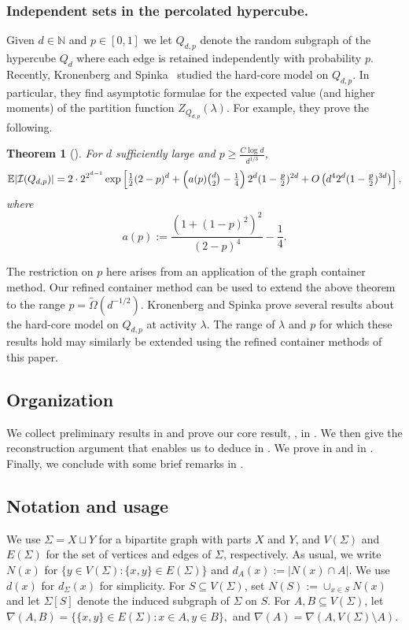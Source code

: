 \documentclass[10pt,a4paper]{amsart}
\newtheorem{thm}{Theorem}[section]
\theoremstyle{definition}
\newcommand{\cI}{\mathcal{I} }
\newcommand{\sub}[0]{\subseteq}
\newcommand{\0}[0]{\emptyset}
\newcommand{\lam}{\lambda}
\begin{document}
\subsubsection*{Independent sets in the percolated hypercube.}

Given $d\in \mathbb{N}$ and $p\in [0,1]$ we let $Q_{d,p}$ denote the random subgraph of the hypercube $Q_d$ where each edge is retained independently with probability $p$. Recently, Kronenberg and Spinka~\cite{kronenberg2022independent} studied the hard-core model on $Q_{d,p}$. In particular, they find asymptotic formulae for the expected value (and higher moments) of the partition function $Z_{Q_{d,p}}(\lam)$. For example, they prove the following.

\begin{thm}[{\cite[Theorem 1.1]{kronenberg2022independent}}]\label{thm:KS}
	For $d$ sufficiently large and $p \ge \frac{C\log d}{d^{1/3}}$,
	\[ \mathbb E |\cI(Q_{d,p})| =
	2 \cdot 2^{2^{d-1}} \exp\left[ \tfrac12 (2-p)^d + \left(a(p)\tbinom d2 -\tfrac14 \right) 2^d (1-\tfrac p2)^{2d} + O\left(d^4 2^d (1- \tfrac p2)^{3d}\right) \right], \]
	where
	\[ a(p) := \frac{(1+(1-p)^2)^2 }{(2-p)^4} - \frac14 .\]
\end{thm}
The restriction on $p$ here arises from an application of the graph container method. Our refined container method can be used to extend the above theorem to the range $p=\tilde\Omega(d^{-1/2})$. Kronenberg and Spinka prove several results about the hard-core model on $Q_{d,p}$ at activity $\lam$. The range of $\lam$ and $p$ for which these results hold may similarly be extended using the refined container methods of this paper. 

\subsection{Organization}  We collect preliminary results in  and prove our core result, , in . We then give the reconstruction argument that enables us to deduce  in . We prove  in  and  in . Finally, we conclude with some brief remarks in . 

\subsection{Notation and usage} We use $\Sigma=X\sqcup Y$ for a bipartite graph with parts $X$ and $Y$, and  $V(\Sigma)$ and $ E(\Sigma)$ for the set of vertices and edges of $\Sigma$, respectively. As usual, we write $N(x)$ for $\{y \in V(\Sigma): \{x,y\} \in E(\Sigma)\}$ and $d_A(x):=|N(x) \cap A|$. We use $d(x)$ for $d_\Sigma(x)$ for simplicity. For $S \sub V(\Sigma)$, set $N(S):= \cup_{x \in S} N(x)$ and let $\Sigma[S]$ denote the induced subgraph of $\Sigma$ on $S$. For $A, B \sub V(\Sigma)$, let $\nabla(A,B)=\{\{x,y\} \in E(\Sigma):x \in A, y \in B\},$ and $\nabla(A)=\nabla(A, V(\Sigma) \setminus A)$.
\end{document}
